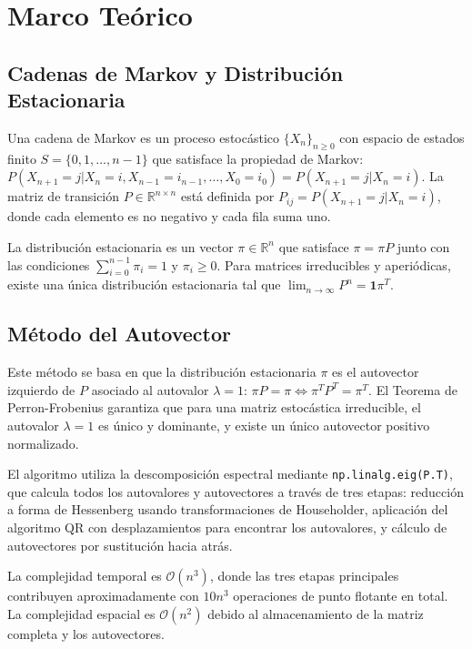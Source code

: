 \section{Marco Teórico}

\subsection{Cadenas de Markov y Distribución Estacionaria}

Una cadena de Markov es un proceso estocástico $\{X_n\}_{n \geq 0}$ con espacio de estados finito $S = \{0, 1, \ldots, n-1\}$ que satisface la propiedad de Markov: $P(X_{n+1} = j | X_n = i, X_{n-1} = i_{n-1}, \ldots, X_0 = i_0) = P(X_{n+1} = j | X_n = i)$. La matriz de transición $P \in \mathbb{R}^{n \times n}$ está definida por $P_{ij} = P(X_{n+1} = j | X_n = i)$, donde cada elemento es no negativo y cada fila suma uno.

La distribución estacionaria es un vector $\pi \in \mathbb{R}^n$ que satisface $\pi = \pi P$ junto con las condiciones $\sum_{i=0}^{n-1} \pi_i = 1$ y $\pi_i \geq 0$. Para matrices irreducibles y aperiódicas, existe una única distribución estacionaria tal que $\lim_{n \to \infty} P^n = \mathbf{1}\pi^T$.

\subsection{Método del Autovector}

Este método se basa en que la distribución estacionaria $\pi$ es el autovector izquierdo de $P$ asociado al autovalor $\lambda = 1$: $\pi P = \pi \Leftrightarrow \pi^T P^T = \pi^T$. El Teorema de Perron-Frobenius garantiza que para una matriz estocástica irreducible, el autovalor $\lambda = 1$ es único y dominante, y existe un único autovector positivo normalizado.

El algoritmo utiliza la descomposición espectral mediante \texttt{np.linalg.eig(P.T)}, que calcula todos los autovalores y autovectores a través de tres etapas: reducción a forma de Hessenberg usando transformaciones de Householder, aplicación del algoritmo QR con desplazamientos para encontrar los autovalores, y cálculo de autovectores por sustitución hacia atrás.

La complejidad temporal es $\mathcal{O}(n^3)$, donde las tres etapas principales contribuyen aproximadamente con $10n^3$ operaciones de punto flotante en total. La complejidad espacial es $\mathcal{O}(n^2)$ debido al almacenamiento de la matriz completa y los autovectores.

